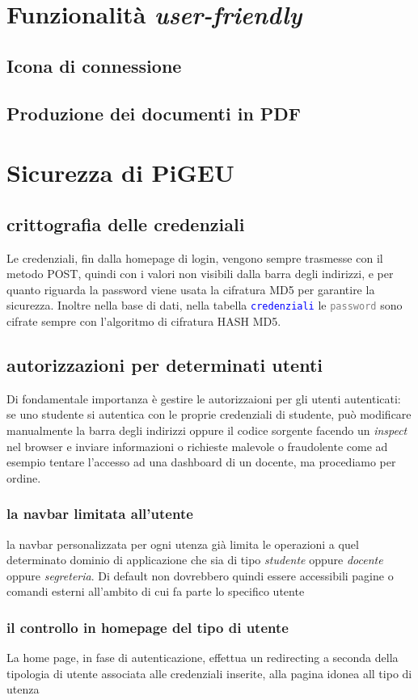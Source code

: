 \documentclass{article}
\newcommand{\tabb}[1]{\texttt{\textcolor{blue}{#1}}}
\newcommand{\attr}[1]{\texttt{\textcolor{gray}{#1}}}
\begin{document}
\section{Funzionalità \textit{user-friendly}}
\subsection{Icona di connessione}
\subsection{Produzione dei documenti in PDF}
\section{Sicurezza di PiGEU}
\subsection{crittografia delle credenziali}
Le credenziali, fin dalla homepage di login, vengono sempre trasmesse con il metodo POST, quindi con i valori non visibili dalla barra degli indirizzi, e per quanto riguarda la password viene usata la cifratura MD5 per garantire la sicurezza.
Inoltre nella base di dati, nella tabella \tabb{credenziali} le \attr{password} sono cifrate sempre con l'algoritmo di cifratura HASH MD5.
\subsection{autorizzazioni per determinati utenti}
Di fondamentale importanza è gestire le autorizzaioni per gli utenti autenticati: se uno studente si autentica con le proprie credenziali di studente, può modificare manualmente la barra degli indirizzi oppure il codice sorgente facendo un \textit{inspect} nel browser e inviare informazioni o richieste malevole o fraudolente come ad esempio tentare l'accesso ad una dashboard di un docente, ma procediamo per ordine.
\subsubsection{la navbar limitata all'utente}
la navbar personalizzata per ogni utenza già limita le operazioni a quel determinato dominio di applicazione che sia di tipo \textit{studente} oppure \textit{docente} oppure \textit{segreteria}. Di default non dovrebbero quindi essere accessibili pagine o comandi esterni all'ambito di cui fa parte lo specifico utente
\subsubsection{il controllo in homepage del tipo di utente}
La home page, in fase di autenticazione, effettua un redirecting a seconda della tipologia di utente associata alle credenziali inserite, alla pagina idonea all tipo di utenza
\end{document}
